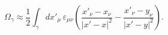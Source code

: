 \begin{equation}
\Omega_\gamma\approx\frac{1}{2}\int_\gamma dx'_\mu\, \varepsilon_{\mu \nu}\left(\frac{x'_\nu-x_\nu}{|x'-x|^2} -\frac{x'_\nu-y_\nu}{|x'-y|^2} \right).
\end{equation}

